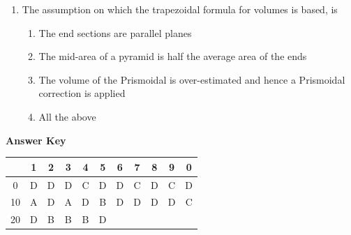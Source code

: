 \documentclass[11pt,a4paper]{article}
\begin{document}
\begin{enumerate}
\begin{enumerate*}[itemjoin=\qquad, label=\Alph*.]
\item{$ {\text{D}}$$ [first area + last area + \sum Even area + 2 \sum odd area $}
\item{$ \frac{{\text{D}}}{3}$$ [first area + last area + 4 \sum Even area + 2 \sum odd area $}
\item{$ \frac{{\text{D}}}{3}$$ [first area + last area + 2 \sum Even area + 4 \sum odd area $}
\item{$ \frac{{\text{D}}}{6}$$ [first area + last area + 2 \sum Even area + 4 \sum odd area $}
\end{enumerate*}
\item{The assumption on which the trapezoidal formula for volumes is based, is}
\begin{enumerate}[label=\Alph*.]
\item{The end sections are parallel planes}
\item{The mid-area of a pyramid is half the average area of the ends}
\item{The volume of the Prismoidal is over-estimated and hence a Prismoidal correction is applied}
\item{All the above}
\end{enumerate}
\end{enumerate}
\textbf{Answer Key}
\begin{tabular}{ | c | c c c c c c c c c c | }
\hline
 & 1 & 2 & 3 & 4 & 5 & 6 & 7 & 8 & 9 & 0 \\
\hline
0 & D & D & D & C & D & D & C & D & C & D \\
10 & A & D & A & D & B & D & D & D & D & C \\
20 & D & B & B & B & D &   &   &   &   &   \\
\hline
\end{tabular}
\end{document}
